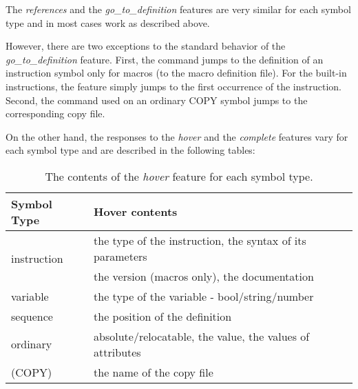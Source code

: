 The \emph{references} and the \emph{go\_to\_definition} features are very similar for each symbol type and in most cases work as described above. 

However, there are two exceptions to the standard behavior of the \emph{go\_to\_definition} feature.
First, the command jumps to the definition of an instruction symbol only for macros (to the macro definition file). For the built-in instructions, the feature simply jumps to the first occurrence of the instruction. Second, the command used on an ordinary COPY symbol jumps to the corresponding copy file.

On the other hand, the responses to the \emph{hover} and the \emph{complete} features vary for each symbol type and are described in the following tables:
\begin{table}[h]
	\centering
	\begin{tabular}{ll}
		\toprule
		\textbf{Symbol Type}            & \textbf{Hover contents}                              \\ \midrule
		\multirow{2}{4cm}{instruction}  & the type of the instruction, the syntax of its parameters \\ 
		                                & the version (macros only), the documentation \\ \midrule
		variable                        & the type of the variable - bool/string/number       \\ \midrule
		sequence                        & the position of the definition                \\ \midrule
		ordinary                        & absolute/relocatable, the value, the values of attributes \\
		(COPY)                          & the name of the copy file                               \\  
		\bottomrule
	\end{tabular}
	\caption{The contents of the \emph{hover} feature for each symbol type.}
\end{table}

